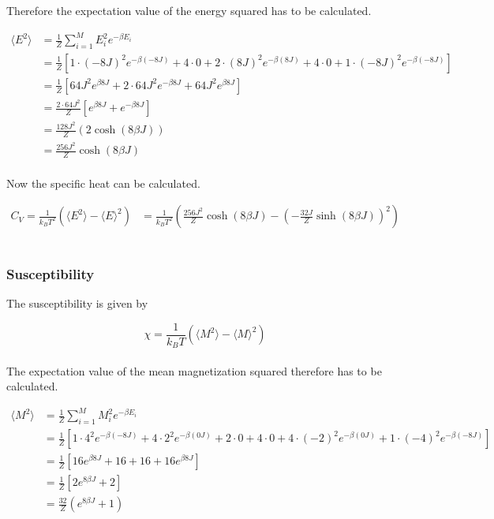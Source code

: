 \documentclass{article}
\begin{document}
Therefore the expectation value of the energy squared has to be calculated.

\begin{align*}
  \langle E^2 \rangle &= \frac{1}{Z} \sum _{i=1} ^M E_i^2 e^{- \beta E_i} \\
  &= \frac{1}{Z} \left[ 1 \cdot (-8J)^2 e^{- \beta (-8J)} + 4 \cdot 0 + 2 \cdot (8J)^2 e^{- \beta (8J)} + 4 \cdot 0 + 1 \cdot (-8J)^2 e^{- \beta (-8J)} \right] \\
  &= \frac{1}{Z} \left[ 64 J^2 e^{\beta 8J} + 2 \cdot 64 J^2 e^{- \beta 8J} + 64 J^2 e^{ \beta 8J} \right] \\
  &= \frac{2 \cdot 64 J^2}{Z} \left[ e^{\beta 8 J} + e^{- \beta 8 J} \right] \\
  &= \frac{128 J^2}{Z} (2 \cosh(8 \beta J) ) \\
  &= \frac{256 J^2}{Z} \cosh(8 \beta J)
\end{align*} \\

Now the specific heat can be calculated.

\begin{align*}
    C_V = \frac{1}{k_B T^2} \left( \langle E^2 \rangle - \langle E \rangle ^2 \right)
    &= \frac{1}{k_B T^2} \left( \frac{256 J^2}{Z} \cosh (8 \beta J) - \left( - \frac{32 J}{Z} \sinh(8 \beta J ) \right) ^2 \right)
\end{align*} \\


\subsubsection{Susceptibility}

The susceptibility is given by

\begin{equation}    \label{eq:susceptibility}
    \chi = \frac{1}{k_B T} \left( \langle M^2 \rangle - \langle M \rangle ^2 \right)
\end{equation} \\

The expectation value of the mean magnetization squared therefore has to be calculated.

\begin{align*}
  \langle M^2 \rangle &= \frac{1}{Z} \sum _{i=1} ^M M_i^2 e^{- \beta E_i} \\
  &= \frac{1}{Z} \left[1 \cdot 4^2 e^{- \beta (-8J)} + 4 \cdot 2^2 e^{- \beta (0J)} + 2 \cdot 0 + 4 \cdot 0 + 4 \cdot (-2)^2 e^{- \beta (0J)} + 1 \cdot (-4)^2 e^{- \beta (-8J)} \right] \\
  &= \frac{1}{Z} \left[ 16 e^{\beta 8J} + 16 + 16 + 16 e^{ \beta 8J} \right] \\
  &= \frac{1}{Z} \left[ 2 e^{8 \beta J} + 2 \right] \\
  &= \frac{32}{Z} \left( e^{8 \beta J} + 1 \right) \\
\end{align*}
\end{document}
